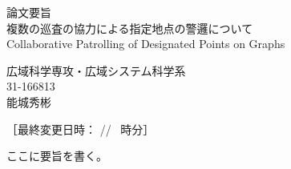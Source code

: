 \documentclass[a4paper,12pt]{jsarticle}
\begin{document}
  \begin{center}
    {\LARGE 論文要旨}\\
    \vfill
    {\LARGE 複数の巡査の協力による指定地点の警邏について}\\
    {\normalsize Collaborative Patrolling of Designated Points on Graphs}
  \end{center}

  \begin{flushright}
  {\large
  広域科学専攻・広域システム科学系 \\
  31-166813 \\
  能城秀彬
  }
  \end{flushright} 
  \vspace{30pt}

  ［最終変更日時：
  {\the\year/\the\month/\the\day\ {\the\hour} 時{\the\minute}分}］

  ここに要旨を書く。





  \thispagestyle{empty}  %
\end{document}
